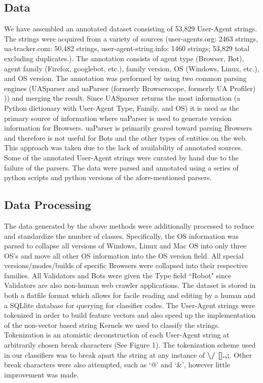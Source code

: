 \documentclass[10pt]{article}
\begin{document}
\begin{multicols}{2}
\subsection{Data}
We have assembled an annotated dataset consisting of 53,829 User-Agent strings.  The strings were acquired from a variety of sources (user-agents.org: 2463 strings, ua-tracker.com: 50,482 strings, user-agent-string.info: 1460 strings; 53,829 total excluding duplicates.).\cite{ua.org,uatracker,uas.info}  The annotation consists of agent type (Browser, Bot), agent family (Firefox, googlebot, etc.), family version, OS (Windows, Linux, etc.), and OS version.  The annotation was performed by using two common parsing engines (UASparser\cite{uas.info} and uaParser (formerly Browserscope, formerly UA Profiler)\cite{uaParser} )) and merging the result.  Since UASparser returns the most information (a Python dictionary with User-Agent Type, Family, and OS) it is used as the primary source of information where uaParser is used to generate version information for Browsers.  uaParser is primarily geared toward parsing Browsers and therefore is not useful for Bots and the other types of entities on the web.   This approach was taken due to the lack of availability of annotated sources.  Some of the annotated User-Agent strings were curated by hand due to the failure of the parsers.  The data were parsed and annotated using a series of python scripts and python versions of the afore-mentioned parsers.  
\subsection{Data Processing}
The data generated by the above methods were additionally processed to reduce and standardize the number of classes.  Specifically, the OS information was parsed to collapse all versions of Windows, Linux and Mac OS into only three OS's and move all other OS information into the OS version field.  All special versions/modes/builds of specific Browsers were collapsed into their respective families.  All Validators and Bots were given the Type field ``Robot" since Validators are also non-human web crawler applications.  The dataset is stored in both a flatfile format which allows for facile reading and editing by a human and a SQLlite database for querying for classifier codes.  
The User-Agent strings were tokenized in order to build feature vectors and also speed up the implementation of the non-vector based string Kernels we used to classify the strings.  Tokenization is an atomistic deconstruction of each User-Agent string at arbitrarily chosen break characters (See Figure 1).  The tokenization scheme used in our classifiers was to break apart the string at any instance of {\bf \textbackslash / [].,;}.  Other break characters were also attempted, such as `@' and `\&', however little improvement was made.  


\end{multicols}
\end{document}
